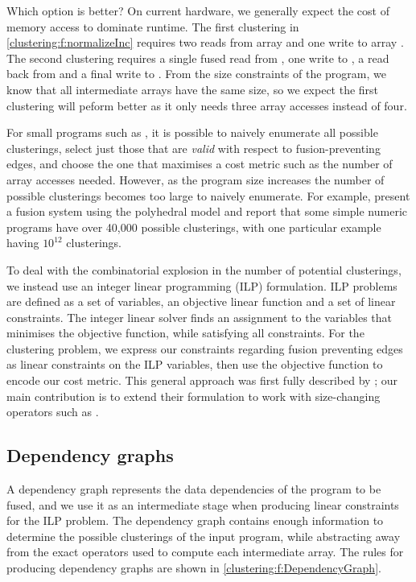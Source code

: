 Which option is better?
On current hardware, we generally expect the cost of memory access to dominate runtime.
The first clustering in \cref{clustering:f:normalizeInc} requires two reads from array \Hs@xs@ and one write to array \Hs@ys@.
The second clustering requires a single fused read from \Hs@xs@, one write to \Hs@incs@, a read back from \Hs@incs@ and a final write to \Hs@ys@.
From the size constraints of the program, we know that all intermediate arrays have the same size, so we expect the first clustering will peform better as it only needs three array accesses instead of four. 

For small programs such as \Hs@normalizeInc@, it is possible to naively enumerate all possible clusterings, select just those that are \emph{valid} with respect to fusion-preventing edges, and choose the one that maximises a cost metric such as the number of array accesses needed.
However, as the program size increases the number of possible clusterings becomes too large to naively enumerate.
For example, \citet{pouchet2010combined,pouchet2011polyhedral} present a fusion system using the polyhedral model and report that some simple numeric programs have over 40,000 possible clusterings, with one particular example having $10^{12}$ clusterings.

To deal with the combinatorial explosion in the number of potential clusterings, we instead use an integer linear programming (ILP) formulation.
ILP problems are defined as a set of variables, an objective linear function and a set of linear constraints.
The integer linear solver finds an assignment to the variables that minimises the objective function, while satisfying all constraints.
For the clustering problem, we express our constraints regarding fusion preventing edges as linear constraints on the ILP variables, then use the objective function to encode our cost metric.
This general approach was first fully described by \citet{megiddo1998optimal}; our main contribution is to extend their formulation to work with size-changing operators such as \Hs@filter@. 


\subsection{Dependency graphs}
A dependency graph represents the data dependencies of the program to be fused, and we use it as an intermediate stage when producing linear constraints for the ILP problem. The dependency graph contains enough information to determine the possible clusterings of the input program, while abstracting away from the exact operators used to compute each intermediate array. The rules for producing dependency graphs are shown in \cref{clustering:f:DependencyGraph}.

